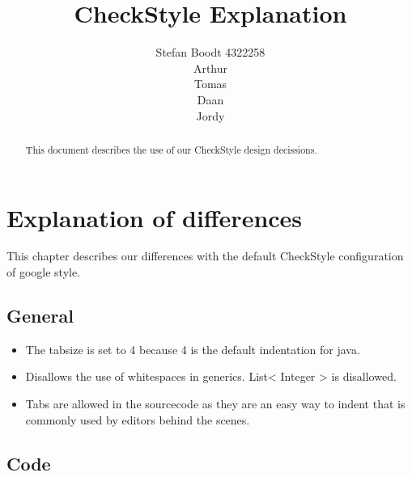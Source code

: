 \documentclass[11pt,a4paper]{report}
\title{CheckStyle Explanation}
\author{Stefan Boodt 4322258\\Arthur\\Tomas\\Daan\\Jordy}
\begin{document}
\maketitle
\begin{abstract}
This document describes the use of our CheckStyle design decissions.
\end{abstract}
\tableofcontents
\newpage
\chapter{Explanation of differences}

This chapter describes our differences with the default CheckStyle configuration of google style.

\section{General}
\begin{itemize}

\item The tabsize is set to 4 because 4 is the default indentation for java.

\item Disallows the use of whitespaces in generics. List< Integer > is disallowed.

\item Tabs are allowed in the sourcecode as they are an easy way to indent that is commonly used by editors behind the scenes.

\end{itemize}

\section{Code}
\end{document}
